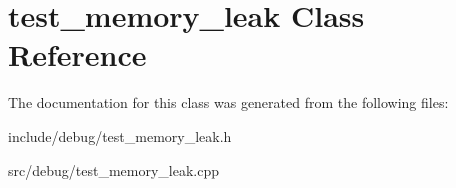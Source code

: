 \hypertarget{classtest__memory__leak}{\section{test\-\_\-memory\-\_\-leak Class Reference}
\label{classtest__memory__leak}
}


The documentation for this class was generated from the following files\-:\begin{DoxyCompactItemize}
\item 
include/debug/test\-\_\-memory\-\_\-leak.\-h\item 
src/debug/test\-\_\-memory\-\_\-leak.\-cpp\end{DoxyCompactItemize}
